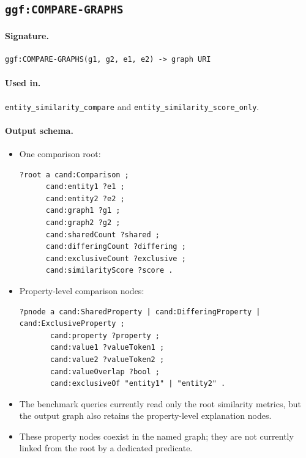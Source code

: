 \subsection{\texttt{ggf:COMPARE-GRAPHS}}
\label{subsec:ggf-compare-graphs}

\paragraph{Signature.}
\begin{verbatim}
ggf:COMPARE-GRAPHS(g1, g2, e1, e2) -> graph URI
\end{verbatim}

\paragraph{Used in.}
\texttt{entity\_similarity\_compare} and
\texttt{entity\_similarity\_score\_only}.

\paragraph{Output schema.}
\begin{itemize}
\item One comparison root:
\begin{verbatim}
?root a cand:Comparison ;
      cand:entity1 ?e1 ;
      cand:entity2 ?e2 ;
      cand:graph1 ?g1 ;
      cand:graph2 ?g2 ;
      cand:sharedCount ?shared ;
      cand:differingCount ?differing ;
      cand:exclusiveCount ?exclusive ;
      cand:similarityScore ?score .
\end{verbatim}
\item Property-level comparison nodes:
\begin{verbatim}
?pnode a cand:SharedProperty | cand:DifferingProperty | cand:ExclusiveProperty ;
       cand:property ?property ;
       cand:value1 ?valueToken1 ;
       cand:value2 ?valueToken2 ;
       cand:valueOverlap ?bool ;
       cand:exclusiveOf "entity1" | "entity2" .
\end{verbatim}
\item The benchmark queries currently read only the root similarity metrics, but
the output graph also retains the property-level explanation nodes.
\item These property nodes coexist in the named graph; they are not currently
linked from the root by a dedicated predicate.
\end{itemize}

